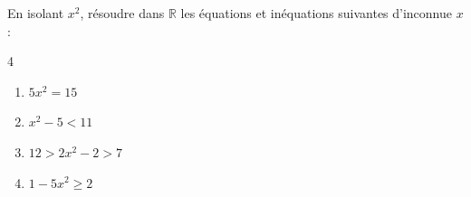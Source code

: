 \documentclass[main.tex]{subfiles}
\begin{document}
\begin{example}En isolant $x^2$, résoudre dans $\mathbb{R}$ les équations et inéquations suivantes d'inconnue $x$ :
	\begin{multicols}{4}
		\begin{enumerate}[label={\alph*)}, leftmargin=*] 
			\item $5x^2=15$ 
			\item  $x^2-5<11 $ 
			\item  $12>2x^2-2>7$ 
			\item $1-5x^2\geqslant 2$   
		\end{enumerate}
	\end{multicols}
\end{example}

\newpage 
{}  
\pagestyle{scrheadings} %
\onehalfspacing
\end{document}
